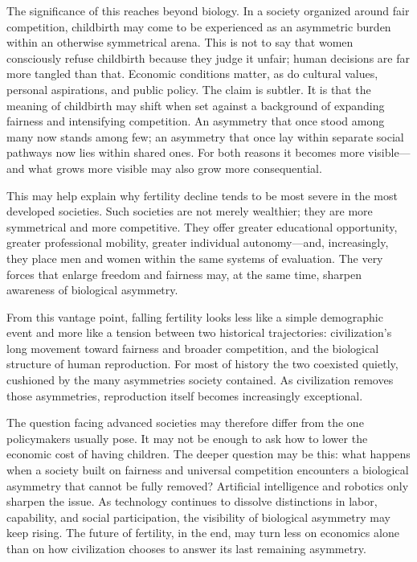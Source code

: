 \documentclass[12pt]{article}
\begin{document}
The significance of this reaches beyond biology. In a society organized around fair competition, childbirth may come to be experienced as an asymmetric burden within an otherwise symmetrical arena. This is not to say that women consciously refuse childbirth because they judge it unfair; human decisions are far more tangled than that. Economic conditions matter, as do cultural values, personal aspirations, and public policy. The claim is subtler. It is that the meaning of childbirth may shift when set against a background of expanding fairness and intensifying competition. An asymmetry that once stood among many now stands among few; an asymmetry that once lay within separate social pathways now lies within shared ones. For both reasons it becomes more visible—and what grows more visible may also grow more consequential.

This may help explain why fertility decline tends to be most severe in the most developed societies. Such societies are not merely wealthier; they are more symmetrical and more competitive. They offer greater educational opportunity, greater professional mobility, greater individual autonomy—and, increasingly, they place men and women within the same systems of evaluation. The very forces that enlarge freedom and fairness may, at the same time, sharpen awareness of biological asymmetry.

From this vantage point, falling fertility looks less like a simple demographic event and more like a tension between two historical trajectories: civilization's long movement toward fairness and broader competition, and the biological structure of human reproduction. For most of history the two coexisted quietly, cushioned by the many asymmetries society contained. As civilization removes those asymmetries, reproduction itself becomes increasingly exceptional.

The question facing advanced societies may therefore differ from the one policymakers usually pose. It may not be enough to ask how to lower the economic cost of having children. The deeper question may be this: what happens when a society built on fairness and universal competition encounters a biological asymmetry that cannot be fully removed? Artificial intelligence and robotics only sharpen the issue. As technology continues to dissolve distinctions in labor, capability, and social participation, the visibility of biological asymmetry may keep rising. The future of fertility, in the end, may turn less on economics alone than on how civilization chooses to answer its last remaining asymmetry.
\end{document}
